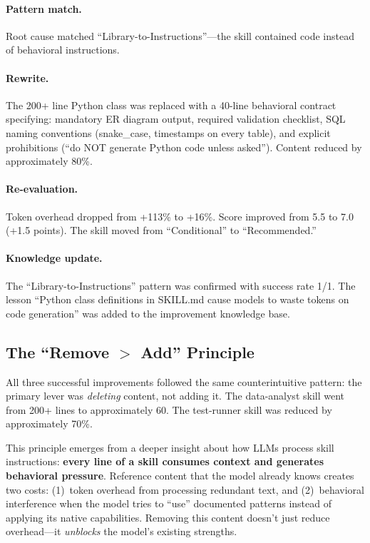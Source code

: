 \documentclass[11pt,a4paper]{article}
\begin{document}
\paragraph{Pattern match.} Root cause matched ``Library-to-Instructions''---the skill contained code instead of behavioral instructions.

\paragraph{Rewrite.} The 200+ line Python class was replaced with a 40-line behavioral contract specifying: mandatory ER diagram output, required validation checklist, SQL naming conventions (snake\_case, timestamps on every table), and explicit prohibitions (``do NOT generate Python code unless asked''). Content reduced by approximately 80\%.

\paragraph{Re-evaluation.} Token overhead dropped from +113\% to +16\%. Score improved from 5.5 to 7.0 (+1.5 points). The skill moved from ``Conditional'' to ``Recommended.''

\paragraph{Knowledge update.} The ``Library-to-Instructions'' pattern was confirmed with success rate 1/1. The lesson ``Python class definitions in SKILL.md cause models to waste tokens on code generation'' was added to the improvement knowledge base.

\subsection{The ``Remove $>$ Add'' Principle}

All three successful improvements followed the same counterintuitive pattern: the primary lever was \emph{deleting} content, not adding it. The data-analyst skill went from 200+ lines to approximately 60. The test-runner skill was reduced by approximately 70\%.

This principle emerges from a deeper insight about how LLMs process skill instructions: \textbf{every line of a skill consumes context and generates behavioral pressure}. Reference content that the model already knows creates two costs: (1)~token overhead from processing redundant text, and (2)~behavioral interference when the model tries to ``use'' documented patterns instead of applying its native capabilities. Removing this content doesn't just reduce overhead---it \emph{unblocks} the model's existing strengths.
\end{document}
